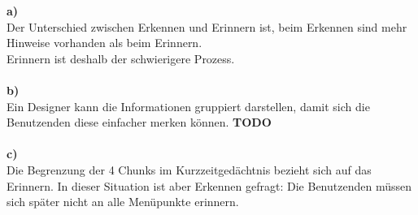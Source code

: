 
\textbf{a)}\\
Der Unterschied zwischen Erkennen und Erinnern ist, beim Erkennen sind mehr Hinweise vorhanden als beim Erinnern. 
\\Erinnern ist deshalb der schwierigere Prozess.
\\\\
\textbf{b)}\\
Ein Designer kann die Informationen gruppiert darstellen, damit sich die Benutzenden diese einfacher merken können.
\textbf{TODO}
\\\\
\textbf{c)}\\
Die Begrenzung der 4 Chunks im Kurzzeitgedächtnis bezieht sich auf das Erinnern.
In dieser Situation ist aber Erkennen gefragt: 
Die Benutzenden müssen sich später nicht an alle Menüpunkte erinnern.